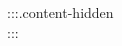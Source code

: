 :::{.content-hidden}
$$
\newcommand{\curlyb}[1]{\left\{ #1 \right\}}
\newcommand{\squareb}[1]{\left[ #1 \right]}
\newcommand{\E}[2]{\mathbb E_{#1} \squareb{#2}}
\newcommand{\sN}{\mathcal N}
$$
:::